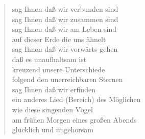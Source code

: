 \documentclass{leadsheet}
\begin{document}
\begin{song}
\begin{multicols}{2}
    \begin{verse}
    sag Ihnen daß wir verbunden sind \\
    sag Ihnen daß wir zusammen sind \\
    sag Ihnen daß wir am Leben sind \\
    auf dieser Erde die uns ähnelt \\
    sag Ihnen daß wir vorwärts gehen \\
    daß es unaufhaltsam ist \\
    kreuzend unsere Unterschiede \\
    folgend den unerreichbaren Sternen \\
    sag Ihnen daß wir erfinden \\
    ein anderes Lied (Bereich) des Möglichen \\
    wie diese singenden Vögel \\
    am frühen Morgen eines großen Abends \\
    glücklich und ungehorsam \\ 
    \end{verse}
        
  \end{multicols}
\end{song}
\end{document}
